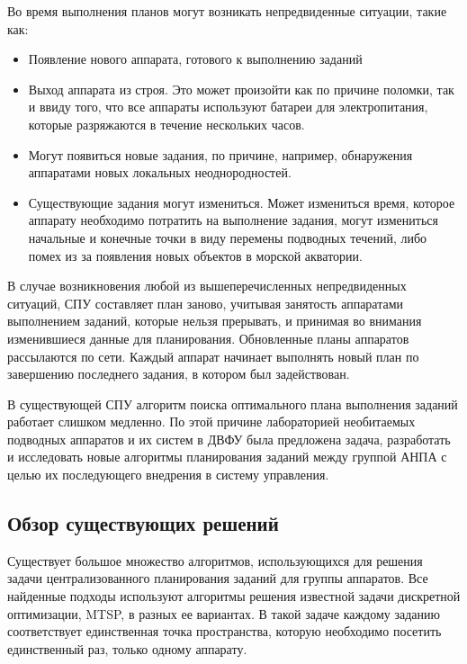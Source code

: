 \documentclass[a4paper,14pt,russian]{article}
\begin{document}
Во время выполнения планов могут возникать непредвиденные ситуации, такие как:
\begin{itemize}
\item Появление нового аппарата, готового к выполнению заданий
\item Выход аппарата из строя. Это может произойти как по причине поломки, так и ввиду того, что все аппараты используют батареи для электропитания, которые разряжаются в течение нескольких часов.
\item Могут появиться новые задания, по причине, например, обнаружения аппаратами новых локальных неоднородностей.
\item Существующие задания могут измениться. Может измениться время, которое аппарату необходимо потратить на выполнение задания, могут измениться начальные и конечные точки в виду перемены подводных течений, либо помех из за появления новых объектов в морской акватории.
\end{itemize}

В случае возникновения любой из вышеперечисленных непредвиденных ситуаций, СПУ составляет план заново, учитывая занятость аппаратами выполнением заданий, которые нельзя прерывать, и принимая во внимания изменившиеся данные для планирования. Обновленные планы аппаратов рассылаются по сети. Каждый аппарат начинает выполнять новый план по завершению последнего задания, в котором был задействован.

В существующей СПУ алгоритм поиска оптимального плана выполнения заданий работает слишком медленно. По этой причине лабораторией необитаемых подводных аппаратов и их систем в ДВФУ была предложена задача, разработать и исследовать новые алгоритмы планирования заданий между группой АНПА с целью их последующего внедрения в систему управления.

\subsection{Обзор существующих решений} \label{mtsp-graph}

Существует большое множество алгоритмов, использующихся для решения задачи централизованного планирования заданий для группы аппаратов.
Все найденные подходы используют алгоритмы решения известной задачи дискретной оптимизации, MTSP, в разных ее вариантах.
В такой задаче каждому заданию соответствует единственная точка пространства, которую необходимо посетить единственный раз, только одному аппарату.
\end{document}
